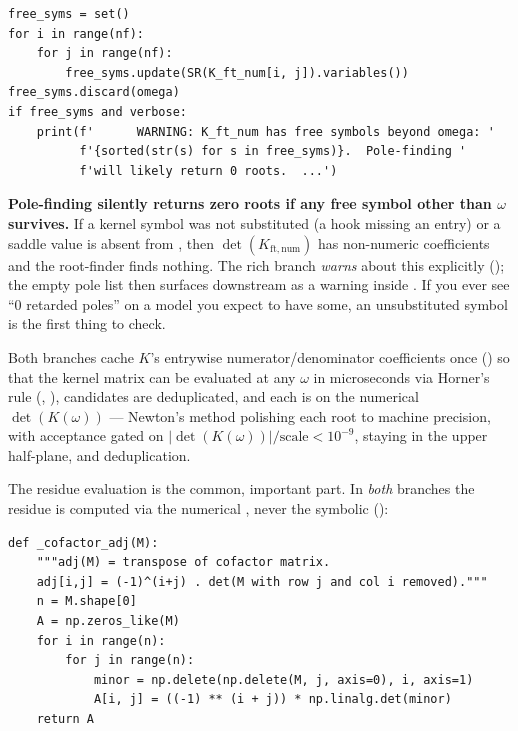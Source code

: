 \begin{lstlisting}
free_syms = set()
for i in range(nf):
    for j in range(nf):
        free_syms.update(SR(K_ft_num[i, j]).variables())
free_syms.discard(omega)
if free_syms and verbose:
    print(f'      WARNING: K_ft_num has free symbols beyond omega: '
          f'{sorted(str(s) for s in free_syms)}.  Pole-finding '
          f'will likely return 0 roots.  ...')
\end{lstlisting}

\begin{gotcha}
\textbf{Pole-finding silently returns zero roots if any free symbol other than
$\omega$ survives.} If a kernel symbol was not substituted (a
 hook missing an entry) or a saddle value is absent from
, then $\det(K_{\mathrm{ft,num}})$ has non-numeric coefficients
and the root-finder finds nothing. The rich branch \emph{warns} about this
explicitly (); the empty pole list then
surfaces downstream as a warning inside . If you ever
see ``$0$ retarded poles'' on a model you expect to have some, an
unsubstituted symbol is the first thing to check.
\end{gotcha}

Both branches cache $K$'s entrywise numerator/denominator coefficients once
() so that the kernel matrix can be evaluated
at any $\omega$ in microseconds via Horner's rule (,
), candidates are deduplicated, and each is
 on the numerical $\det(K(\omega))$ --- Newton's method
polishing each root to machine precision, with acceptance gated on
$|\det(K(\omega))|/\text{scale} < 10^{-9}$, staying in the upper half-plane, and
deduplication.

The residue evaluation is the common, important part. In \emph{both} branches the
residue is computed via the numerical , never the
symbolic  ():

\begin{lstlisting}
def _cofactor_adj(M):
    """adj(M) = transpose of cofactor matrix.
    adj[i,j] = (-1)^(i+j) . det(M with row j and col i removed)."""
    n = M.shape[0]
    A = np.zeros_like(M)
    for i in range(n):
        for j in range(n):
            minor = np.delete(np.delete(M, j, axis=0), i, axis=1)
            A[i, j] = ((-1) ** (i + j)) * np.linalg.det(minor)
    return A
\end{lstlisting}

